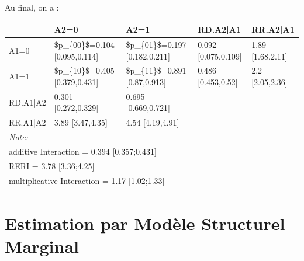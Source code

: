 \documentclass[
]{book}
\begin{document}
Au final, on a :

\begin{table}
\centering
\begin{tabular}[t]{l|l|l|l|l}
\hline
  & A2=0 & A2=1 & RD.A2|A1 & RR.A2|A1\\
\hline
A1=0 & \$p\_\{00\}\$=0.104 [0.095,0.114] & \$p\_\{01\}\$=0.197 [0.182,0.211] & 0.092 [0.075,0.109] & 1.89 [1.68,2.11]\\
\hline
A1=1 & \$p\_\{10\}\$=0.405 [0.379,0.431] & \$p\_\{11\}\$=0.891 [0.87,0.913] & 0.486 [0.453,0.52] & 2.2 [2.05,2.36]\\
\hline
RD.A1|A2 & 0.301 [0.272,0.329] & 0.695 [0.669,0.721] &  & \\
\hline
RR.A1|A2 & 3.89 [3.47,4.35] & 4.54 [4.19,4.91] &  & \\
\hline
\multicolumn{5}{l}{\rule{0pt}{1em}\textit{Note: }}\\
\multicolumn{5}{l}{\rule{0pt}{1em}additive Interaction = 0.394 [0.357;0.431]}\\
\multicolumn{5}{l}{\rule{0pt}{1em}RERI = 3.78 [3.36;4.25]}\\
\multicolumn{5}{l}{\rule{0pt}{1em}multiplicative Interaction = 1.17 [1.02;1.33]}\\
\end{tabular}
\end{table}

\hypertarget{estimation-par-moduxe8le-structurel-marginal}{%
\section{Estimation par Modèle Structurel Marginal}\label{estimation-par-moduxe8le-structurel-marginal}}
\end{document}
